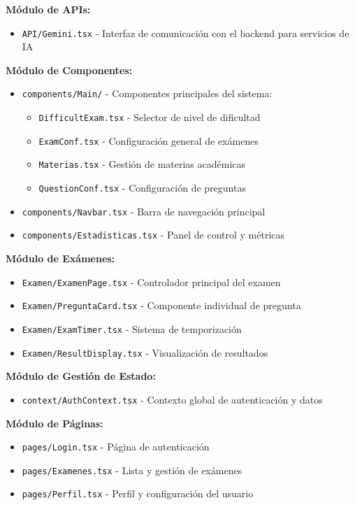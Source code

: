 \documentclass[12pt,a4paper]{report}
\begin{document}
\textbf{Módulo de APIs:}
\begin{itemize}
\item \texttt{API/Gemini.tsx} - Interfaz de comunicación con el backend para servicios de IA
\end{itemize}

\textbf{Módulo de Componentes:}
\begin{itemize}
\item \texttt{components/Main/} - Componentes principales del sistema:
  \begin{itemize}
  \item \texttt{DifficultExam.tsx} - Selector de nivel de dificultad
  \item \texttt{ExamConf.tsx} - Configuración general de exámenes
  \item \texttt{Materias.tsx} - Gestión de materias académicas
  \item \texttt{QuestionConf.tsx} - Configuración de preguntas
  \end{itemize}
\item \texttt{components/Navbar.tsx} - Barra de navegación principal
\item \texttt{components/Estadisticas.tsx} - Panel de control y métricas
\end{itemize}

\textbf{Módulo de Exámenes:}
\begin{itemize}
\item \texttt{Examen/ExamenPage.tsx} - Controlador principal del examen
\item \texttt{Examen/PreguntaCard.tsx} - Componente individual de pregunta
\item \texttt{Examen/ExamTimer.tsx} - Sistema de temporización
\item \texttt{Examen/ResultDisplay.tsx} - Visualización de resultados
\end{itemize}

\textbf{Módulo de Gestión de Estado:}
\begin{itemize}
\item \texttt{context/AuthContext.tsx} - Contexto global de autenticación y datos
\end{itemize}

\textbf{Módulo de Páginas:}
\begin{itemize}
\item \texttt{pages/Login.tsx} - Página de autenticación
\item \texttt{pages/Examenes.tsx} - Lista y gestión de exámenes
\item \texttt{pages/Perfil.tsx} - Perfil y configuración del usuario
\end{itemize}
\end{document}
